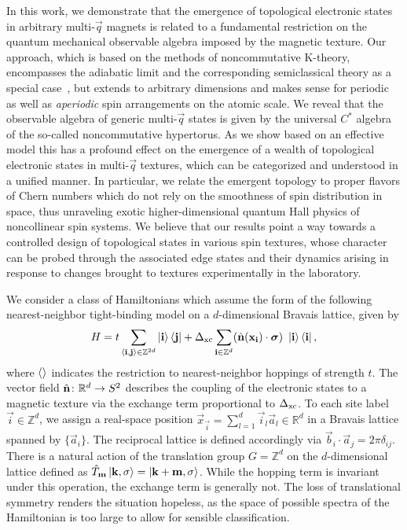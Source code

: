 \documentclass[
    10pt,
    aps,
    prl,
    twocolumn,
    floatfix,
    superscriptaddress
]{revtex4-2}
\begin{document}
In this work, we demonstrate that the emergence of topological electronic states in arbitrary multi-$\vec{q}$ magnets is related to a fundamental restriction on the quantum mechanical observable algebra imposed by the magnetic texture. 
Our approach, which is based on the methods of noncommutative K-theory, encompasses the adiabatic limit and the corresponding semiclassical theory as a special case~\cite{Su2020}, but extends 
to arbitrary dimensions and makes sense for periodic as well as {\it aperiodic} spin arrangements on the atomic scale.
We reveal that the observable algebra of generic multi-$\vec{q}$ states is given by the universal $C^\ast$ algebra of the so-called noncommutative hypertorus. As we show based on an effective model this has a profound effect on the emergence of a wealth of topological electronic states in multi-$\vec{q}$ textures, which can be categorized and understood in a unified manner. 
In particular, we relate the emergent topology to proper flavors of Chern numbers which do not rely on the smoothness of spin distribution in space, thus unraveling  exotic higher-dimensional quantum Hall physics of noncollinear spin systems.
We believe that our results point a way towards a controlled design of topological states in various spin textures, whose character can be probed through the associated edge states and their dynamics arising in response to changes brought to textures experimentally in the laboratory. 



We consider a class of Hamiltonians which assume the form of the following nearest-neighbor tight-binding model on a $d$-dimensional Bravais lattice, given by
\begin{align}
    H  = t \sum_{\braket{\mathbf{i},\mathbf{j}} \in \mathbb{Z}^{2d}} \ket{\mathbf{i}}\bra{\mathbf{j}}
    + \Delta_\mathrm{xc}\sum_{\mathbf{i} \in \mathbb{Z}^d}  (\hat{\mathbf{n}} (\mathbf{x}_{\mathbf{i}}) \cdot \boldsymbol{\sigma}) ~ \ket{\mathbf{i}}\bra{\mathbf{i}} ,
    \label{eq:hamiltonian}
\end{align}
where $\braket{}$ indicates the restriction to nearest-neighbor hoppings of strength $t$.
The vector field $\hat{\mathbf{n}}\colon \mathbb{R}^d \to S^2$ describes the coupling of the electronic states to a magnetic texture via the exchange term proportional to $\Delta_\mathrm{xc}$. 
To each site label $\vec{i} \in \mathbb{Z}^d$, we assign a real-space position $\vec{x}_\vec{i} = \sum_{l=1}^d \vec{i}_l \vec{a}_l \in \mathbb{R}^d$ in a Bravais lattice spanned by $\lbrace \vec{a}_i \rbrace$. 
The reciprocal lattice is defined accordingly via $ \vec{b}_i \cdot \vec{a}_j  = 2\pi \delta_{ij}$.
There is a natural action of the translation group $G = \mathbb{Z}^d$ on the $d$-dimensional lattice defined as
$
    \hat{T}_{\mathbf{m}} \ket{\mathbf{k}, \sigma}  =  \ket{\mathbf{k}+ \mathbf{m}, \sigma}
$.
While the hopping term is invariant under this operation, the exchange term is generally not.
The loss of translational symmetry renders the situation hopeless, as the space of possible spectra of the Hamiltonian is too large to allow for sensible classification.
\end{document}
